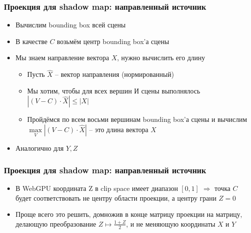 \documentclass[10pt]{beamer}
\begin{document}
\begin{frame}[fragile]
\frametitle{Проекция для shadow map: направленный источник}
\begin{itemize}
\item Вычислим bounding box всей сцены
\pause
\item В качестве \begin{math}C\end{math} возьмём центр bounding box'а сцены
\pause
\item Мы знаем направление вектора \begin{math}X\end{math}, нужно вычислить его длину
\begin{itemize}
\item Пусть \begin{math}\hat X\end{math} -- вектор направления (нормированный)
\item Мы хотим, чтобы для всех вершин \begin{math}И\end{math} сцены выполнялось \begin{math}|(V - C) \cdot \hat X| \leq |X|\end{math}
\pause
\item Пройдёмся по всем восьми вершинам bounding box'а сцены и вычислим \begin{math}\max\limits_V |(V - C) \cdot \hat X|\end{math} -- это длина вектора \begin{math}X\end{math}
\end{itemize}
\pause
\item Аналогично для \begin{math}Y, Z\end{math}
\end{itemize}
\end{frame}

\begin{frame}[fragile]
\frametitle{Проекция для shadow map: направленный источник}
\begin{itemize}
\item В WebGPU координата Z в clip space имеет диапазон \([0,1]\) \(\Longrightarrow\) точка \(C\) будет соответствовать не центру области проекции, а центру грани \(Z=0\)
\pause
\item Проще всего это решить, домножив в конце матрицу проекции на матрицу, делающую преобразование \(Z \mapsto \frac{1+Z}{2}\), и не меняющую координаты \(X\) и \(Y\)
\end{itemize}
\end{frame}
\end{document}
